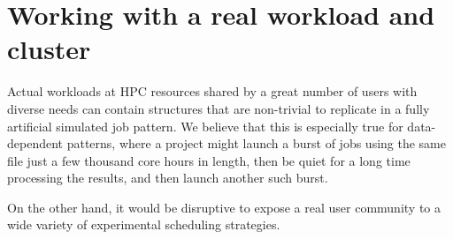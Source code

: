 \documentclass[conference,10pt]{IEEEtran}
\newcommand{\Node}[1]{\ensuremath{\mathrm{Node}_{#1}}\xspace}
\newcommand{\file}{\ensuremath{\mathit{File}}\xspace}
\newcommand{\bandwidth}{\mathit{BW}\xspace}
\newcommand{\core}{\mathit{Cores}\xspace}
\newcommand{\jobset}{\ensuremath{\mathbb{J}}\xspace}
\newcommand{\nodeset}{\ensuremath{\mathbb{N}}\xspace}
\begin{document}
\begin{algorithm}[htbp]
\begin{algorithmic}[1]
\end{algorithmic}
\end{algorithm}

\section{Working with a real workload and cluster}\label{sec.working}
Actual workloads at HPC resources shared by a great number of users with diverse needs can contain structures
that are non-trivial to replicate in a fully artificial simulated job pattern. We believe that this is especially
true for data-dependent patterns, where a project might launch a burst of jobs using the same file just a few thousand
core hours in length, then be quiet for a long time processing the results, and then launch another such burst.

On the other hand, it would be disruptive to expose a real user community to a wide variety of experimental scheduling strategies.
\end{document}
